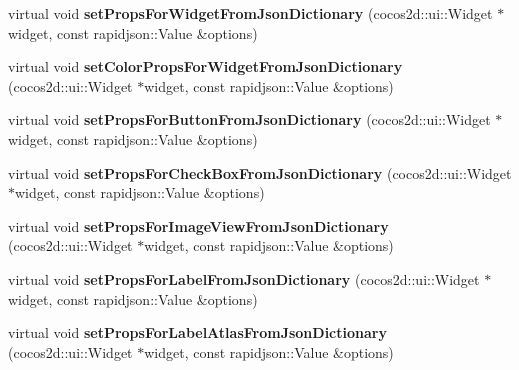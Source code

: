 \begin{DoxyCompactItemize}
\item 
\mbox{\label{classcocostudio_1_1WidgetPropertiesReader0250_a8325e4e22f98cceee2392e62bd7c9049}} 
virtual void {\bfseries set\+Props\+For\+Widget\+From\+Json\+Dictionary} (cocos2d\+::ui\+::\+Widget $\ast$widget, const rapidjson\+::\+Value \&options)
\item 
\mbox{\label{classcocostudio_1_1WidgetPropertiesReader0250_a52e858e23e656345de7aec637b45724d}} 
virtual void {\bfseries set\+Color\+Props\+For\+Widget\+From\+Json\+Dictionary} (cocos2d\+::ui\+::\+Widget $\ast$widget, const rapidjson\+::\+Value \&options)
\item 
\mbox{\label{classcocostudio_1_1WidgetPropertiesReader0250_a123aca113a6063f96b63c5ccfc1211b8}} 
virtual void {\bfseries set\+Props\+For\+Button\+From\+Json\+Dictionary} (cocos2d\+::ui\+::\+Widget $\ast$widget, const rapidjson\+::\+Value \&options)
\item 
\mbox{\label{classcocostudio_1_1WidgetPropertiesReader0250_ae621f50b558732b1d65887232ca8b7aa}} 
virtual void {\bfseries set\+Props\+For\+Check\+Box\+From\+Json\+Dictionary} (cocos2d\+::ui\+::\+Widget $\ast$widget, const rapidjson\+::\+Value \&options)
\item 
\mbox{\label{classcocostudio_1_1WidgetPropertiesReader0250_a5c38162a20564fdb20c24b24a7a95a77}} 
virtual void {\bfseries set\+Props\+For\+Image\+View\+From\+Json\+Dictionary} (cocos2d\+::ui\+::\+Widget $\ast$widget, const rapidjson\+::\+Value \&options)
\item 
\mbox{\label{classcocostudio_1_1WidgetPropertiesReader0250_a2981849bcef798292b5c9f10dc686719}} 
virtual void {\bfseries set\+Props\+For\+Label\+From\+Json\+Dictionary} (cocos2d\+::ui\+::\+Widget $\ast$widget, const rapidjson\+::\+Value \&options)
\item 
\mbox{\label{classcocostudio_1_1WidgetPropertiesReader0250_aeeb47be06c42c378ba253224c57292bb}} 
virtual void {\bfseries set\+Props\+For\+Label\+Atlas\+From\+Json\+Dictionary} (cocos2d\+::ui\+::\+Widget $\ast$widget, const rapidjson\+::\+Value \&options)

\end{DoxyCompactItemize}
